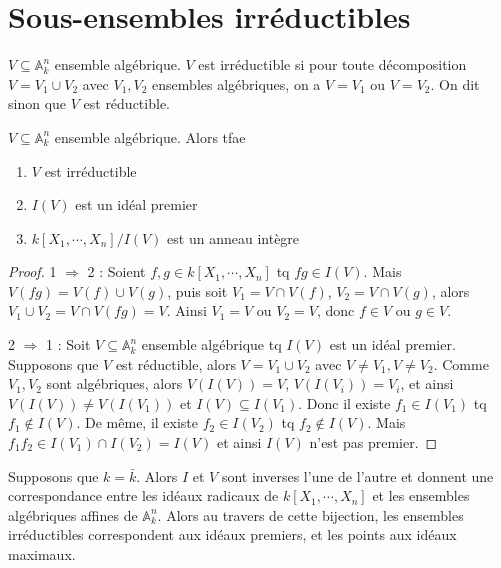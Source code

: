         \section{Sous-ensembles irréductibles}
            \begin{defi}
                $V \subseteq \mathbb{A}_k^n$ ensemble algébrique. $V$ est irréductible si pour toute décomposition $V = V_1 \cup V_2$ avec $V_1,V_2$ ensembles algébriques, on a $V = V_1$ ou $V = V_2$. On dit sinon que $V$ est réductible.
            \end{defi}
            \begin{prop}
                $V \subseteq \mathbb{A}_k^n$ ensemble algébrique. Alors tfae
                \begin{enumerate}
                    \item $V$ est irréductible
                    \item $I(V)$ est un idéal premier
                    \item $k[X_1, \cdots, X_n]/I(V)$ est un anneau intègre
                \end{enumerate}
            \end{prop}
            \begin{proof}
                \item 1 $\Rightarrow$ 2 : Soient $f,g \in k[X_1, \cdots, X_n]$ tq $fg \in I(V)$. Mais $V(fg) = V(f) \cup V(g)$, puis soit $V_1 = V \cap V(f)$, $V_2 = V \cap V(g)$, alors $V_1 \cup V_2 = V \cap V(fg) = V$. Ainsi $V_1 = V$ ou $V_2 = V$, donc $f \in V$ ou $g \in V$.
                \item 2 $\Rightarrow$ 1 : Soit $V \subseteq \mathbb{A}_k^n$ ensemble algébrique tq $I(V)$ est un idéal premier. Supposons que $V$ est réductible, alors $V = V_1 \cup V_2$ avec $V \neq V_1, V \neq V_2$. Comme $V_1,V_2$ sont algébriques, alors $V(I(V)) = V$, $V(I(V_i)) = V_i$, et ainsi $V(I(V)) \neq V(I(V_1))$ et $I(V) \subseteq I(V_1)$. Donc il existe $f_1 \in I(V_1)$ tq $f_1 \notin I(V)$. De même, il existe $f_2 \in I(V_2)$ tq $f_2 \notin I(V)$. Mais $f_1f_2 \in I(V_1) \cap I(V_2) = I(V)$ et ainsi $I(V)$ n'est pas premier.
            \end{proof}
            \begin{remq}
                Supposons que $k = \bar k$. Alors $I$ et $V$ sont inverses l'une de l'autre et donnent une correspondance entre les idéaux radicaux de $k[X_1, \cdots, X_n]$ et les ensembles algébriques affines de $\mathbb{A}_k^n$. Alors au travers de cette bijection, les ensembles irréductibles correspondent aux idéaux premiers, et les points aux idéaux maximaux.
            \end{remq}
